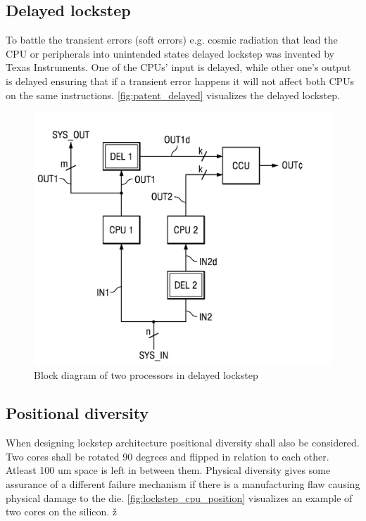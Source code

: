 \subsection{Delayed lockstep \citep{patent_delayed_lockstep}}
 
To battle the transient errors (soft errors) e.g. cosmic radiation that lead the CPU or peripherals into unintended states delayed lockstep was invented by Texas Instruments. One of the CPUs' input is delayed, while other one's output is delayed ensuring that if a transient error happens it will not affect both CPUs on the same instructions. \autoref{fig:patent_delayed} visualizes the delayed lockstep.

\begin{figure}[H]

      \centering
      \includegraphics[width=0.8\linewidth]{images/patent_delayed.png}
      \caption{Block diagram of two processors in delayed lockstep}
      \label{fig:patent_delayed}
    
\end{figure}

\subsection{Positional diversity}

When designing lockstep architecture positional diversity shall also be considered. Two cores shall be rotated 90 degrees and flipped in relation to each other. Atleast 100 um space is left in between them. Physical diversity gives some assurance of a different failure mechanism if
there is a manufacturing flaw causing physical damage to the die. \autoref{fig:lockstep_cpu_position} visualizes an example of two cores on the silicon. ž

